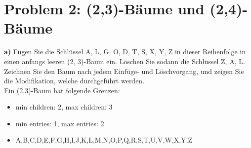 \section*{Problem 2: (2,3)-Bäume und (2,4)-Bäume} 


\textbf{a)} Fügen Sie die Schlüssel A, L, G, O, D, T, S, X, Y, Z in dieser Reihenfolge in einen anfangs leeren (2, 3)-Baum ein. Löschen Sie sodann die Schlüssel Z, A, L. Zeichnen Sie den Baum nach jedem Einfüge- und Löschvorgang, und zeigen Sie die Modifikation, welche durchgeführt werden. \\


Ein (2,3)-Baum hat folgende Grenzen:
\begin{itemize}
\item min children: 2, max children: 3
\item min entries: 1, max entries: 2
\item A,B,C,D,E,F,G,H,I,J,K,L,M,N,O,P,Q,R,S,T,U,V,W,X,Y,Z
\end{itemize}

